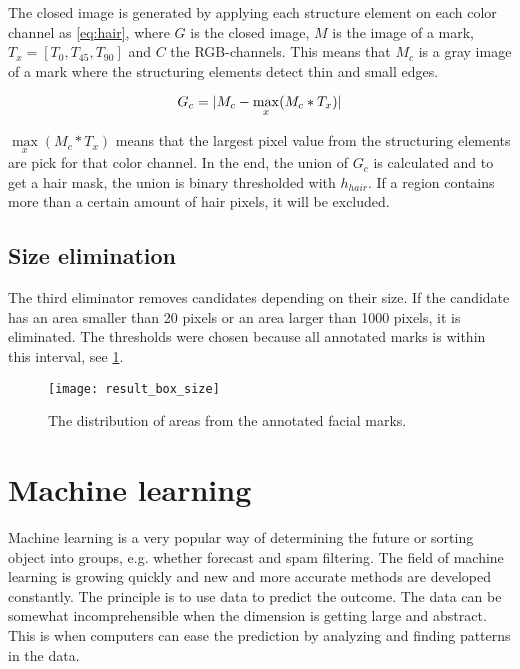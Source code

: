 The closed image is generated by applying each structure element on each color channel as \eqref{eq:hair}, where $G$ is the closed image, $M$ is the image of a mark, $T_x = [T_{0}, T_{45}, T_{90} ]$ and $C$ the RGB-channels. This means that $M_c$ is a gray image of a mark where the structuring elements detect thin and small edges.    

\begin{equation} \label{eq:hair}
G_c = \lvert M_c - \max_{x}(M_c * T_x)\rvert 
\end{equation}

$\max\limits_x(M_c * T_x)$ means that the largest pixel value from the structuring elements are pick for that color channel. In the end, the union of $G_c$ is calculated and to get a hair mask, the union is binary thresholded with $h_{hair}$. If a region contains more than a certain amount of hair pixels, it will be excluded.

\subsection{Size elimination} \label{subsec:size_eli} 

The third eliminator removes candidates depending on their size. If the candidate has an area smaller than 20 pixels or an area larger than 1000 pixels, it is eliminated. The thresholds were chosen because all annotated marks is within this interval, see \cref{fig:result_box_size}.

\FloatBarrier
\begin{figure}[!h]
	\centering
	\texttt{[image: result\_box\_size]}
	\caption{The distribution of areas from the annotated facial marks.  \label{fig:result_box_size}}
\end{figure}
\FloatBarrier

\section{Machine learning} \label{sec:machine_learning} 

Machine learning is a very popular way of determining the future or sorting object into groups, e.g. whether forecast and spam filtering. The field of machine learning is growing quickly and new and more accurate methods are developed constantly. The principle is to use data to predict the outcome. The data can be somewhat incomprehensible when the dimension is getting large and abstract. This is when computers can ease the prediction by analyzing and finding patterns in the data. 

